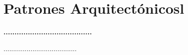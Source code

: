 \section{ Patrones Arquitectónicosl} 
\textbf{........................................}\\
\begin{flushleft}
......................................
\end{flushleft}